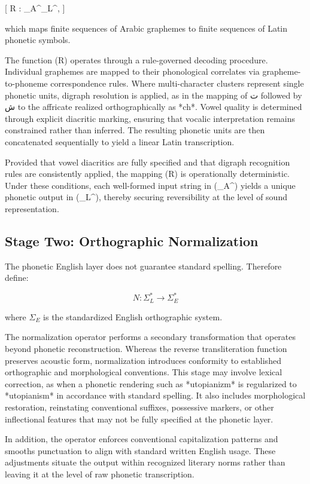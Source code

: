\documentclass[12pt]{article}
\begin{document}
[
R : \Sigma_A^\ast \rightarrow \Sigma_L^\ast,
]

which maps finite sequences of Arabic graphemes to finite sequences of Latin phonetic symbols.

The function (R) operates through a rule-governed decoding procedure. Individual graphemes are mapped to their phonological correlates via grapheme-to-phoneme correspondence rules. Where multi-character clusters represent single phonetic units, digraph resolution is applied, as in the mapping of ت followed by ش to the affricate realized orthographically as *ch*. Vowel quality is determined through explicit diacritic marking, ensuring that vocalic interpretation remains constrained rather than inferred. The resulting phonetic units are then concatenated sequentially to yield a linear Latin transcription.

Provided that vowel diacritics are fully specified and that digraph recognition rules are consistently applied, the mapping (R) is operationally deterministic. Under these conditions, each well-formed input string in (\Sigma_A^\ast) yields a unique phonetic output in (\Sigma_L^\ast), thereby securing reversibility at the level of sound representation.

\subsection{Stage Two: Orthographic Normalization}

The phonetic English layer does not guarantee standard spelling. Therefore define:

\[
N : \Sigma_{L}^\ast \rightarrow \Sigma_{E}^\ast
\]

where $\Sigma_{E}$ is the standardized English orthographic system.

The normalization operator performs a secondary transformation that operates beyond phonetic reconstruction. Whereas the reverse transliteration function preserves acoustic form, normalization introduces conformity to established orthographic and morphological conventions. This stage may involve lexical correction, as when a phonetic rendering such as *utopianizm* is regularized to *utopianism* in accordance with standard spelling. It also includes morphological restoration, reinstating conventional suffixes, possessive markers, or other inflectional features that may not be fully specified at the phonetic layer.

In addition, the operator enforces conventional capitalization patterns and smooths punctuation to align with standard written English usage. These adjustments situate the output within recognized literary norms rather than leaving it at the level of raw phonetic transcription.
\end{document}
